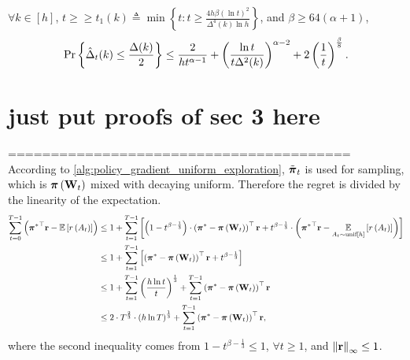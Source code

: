 \begin{lem}
	\label{lem:delta_estimation_lower_bound}
	$\forall k \in [h]$, $t \ge \ge t_1(k) \triangleq \min{\left\{ t : t \ge \frac{4 h \beta \left(\ln{t}\right)^2}{\Delta^4(k) \ln{h}} \right\}}$, and $\beta \ge 64 (\alpha +1)$,
	\begin{equation*}
	{\text{Pr}}\left\{ \hat{\Delta}_t(k) \le \frac{\Delta(k)}{2} \right\} \le \frac{2}{ h t^{\alpha-1}} + \left( \frac{\ln{t}}{t \Delta^2(k)} \right)^{\alpha - 2} + 2 \left(\frac{1}{t}\right)^{\frac{\beta}{8}}.
	\end{equation*}
\end{lem}

\section{just put proofs of sec 3 here}

========================================\\
According to \cref{alg:policy_gradient_uniform_exploration}, $\tilde{{\boldsymbol{\pi}}}_t$ is used for sampling, which is ${\boldsymbol{\pi}}\left( {\mathbf{W}}_t \right)$ mixed with decaying uniform. Therefore the regret is divided by the linearity of the expectation.
\begin{equation}
\label{eq:total_regret_decomposition}
\begin{split}
    \sum\limits_{t=0}^{T-1}{ \left( {{\boldsymbol{\pi}}^*}^\top {\mathbf{r}} - {\mathbb{E}} \left[ r\left(A_t\right) \right] \right) } &\le 1 + \sum\limits_{t=1}^{T-1}{ \left[ \left( 1 - t^{ \beta - \frac{1}{3}} \right) \cdot \left( {{\boldsymbol{\pi}}^*} - {\boldsymbol{\pi}}\left( {\mathbf{W}}_t \right) \right)^\top {\mathbf{r}} + t^{ \beta - \frac{1}{3}} \cdot \left( {{\boldsymbol{\pi}}^*}^\top {\mathbf{r}} - \operatorname*{{\mathbb{E}}}\limits_{A_t \sim {\text{unif}}[h]}{ \left[ r\left(A_t\right) \right] } \right) \right]} \\
    &\le 1 + \sum\limits_{t=1}^{T-1}{ \left[ \left( {{\boldsymbol{\pi}}^*} - {\boldsymbol{\pi}}\left( {\mathbf{W}}_t \right) \right)^\top {\mathbf{r}} + t^{ \beta - \frac{1}{3}} \right]} \\
    &\le 1 + \sum\limits_{t=1}^{T-1}{ \left( \frac{ h \ln{t} }{t} \right)^{\frac{1}{3}} } + \sum\limits_{t=1}^{T-1}{ \left( {{\boldsymbol{\pi}}^*} - {\boldsymbol{\pi}}\left( {\mathbf{W}}_t \right) \right)^\top {\mathbf{r}} } \\
    &\le 2 \cdot T^{\frac{2}{3}} \cdot \left( h \ln{T} \right)^{\frac{1}{3}} + \sum\limits_{t=1}^{T-1}{ \left( {{\boldsymbol{\pi}}^*} - {\boldsymbol{\pi}}\left( {\mathbf{W}}_t \right) \right)^\top {\mathbf{r}} },
\end{split}
\end{equation}
where the second inequality comes from $1 - t^{ \beta - \frac{1}{3}} \le 1$, $\forall t \ge 1$, and $\left\| {\mathbf{r}} \right\|_\infty \le 1$.

